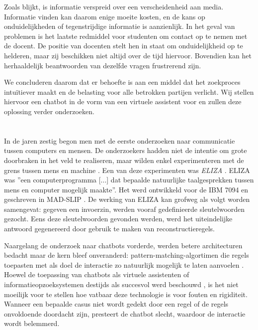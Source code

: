 Zoals blijkt, is informatie verspreid over een verscheidenheid aan media. Informatie vinden kan daarom enige moeite kosten, en de kans op onduidelijkheden of tegenstrijdige informatie is aanzienlijk. In het geval van problemen is het laatste redmiddel voor studenten om contact op te nemen met de docent. De positie van docenten stelt hen in staat om onduidelijkheid op te helderen, maar zij beschikken niet altijd over de tijd hiervoor. Bovendien kan het herhaaldelijk beantwoorden van dezelfde vragen frustrerend zijn.

We concluderen daarom dat er behoefte is aan een middel dat het zoekproces intuïtiever maakt en de belasting voor alle betrokken partijen verlicht. Wij stellen hiervoor een chatbot in de vorm van een virtuele assistent voor en zullen deze oplossing verder onderzoeken.

\section{}%
\label{sec:chatbots}

In de jaren zestig begon men met de eerste onderzoeken naar communicatie tussen computers en mensen. De onderzoekers hadden niet de intentie om grote doorbraken in het veld te realiseren, maar wilden enkel experimenteren met de grens tussen mens en machine \autocite{Dibitonto2018, AbuShawar2007}. Een van deze experimenten was \textit{ELIZA} \autocite{Weizenbaum1966}. ELIZA was ''een computerprogramma [...] dat bepaalde natuurlijke taalgesprekken tussen mens en computer mogelijk maakte''. Het werd ontwikkeld voor de IBM 7094 en geschreven in MAD-SLIP \autocite{Weizenbaum1966}. De werking van ELIZA kan grofweg als volgt worden samengevat: gegeven een invoerzin, werden vooraf gedefinieerde sleutelwoorden gezocht. Eens deze sleutelwoorden gevonden werden, werd het uiteindelijke antwoord gegenereerd door gebruik te maken van reconstructieregels. 

Naargelang de onderzoek naar chatbots vorderde, werden betere architecturen bedacht maar de kern bleef onveranderd: pattern-matching-algortimen die regels toepasten met als doel de interactie zo natuurlijk mogelijk te laten aanvoelen \autocite{AbuShawar2007}. Hoewel de toepassing van chatbots als virtuele assistenten of informatieopzoeksystemen destijds als succesvol werd beschouwd \autocite{AbuShawar2007}, is het niet moeilijk voor te stellen hoe vatbaar deze technologie is voor fouten en rigiditeit. Wanneer een bepaalde casus niet wordt gedekt door een regel of de regels onvoldoende doordacht zijn, presteert de chatbot slecht, waardoor de interactie wordt belemmerd. 

